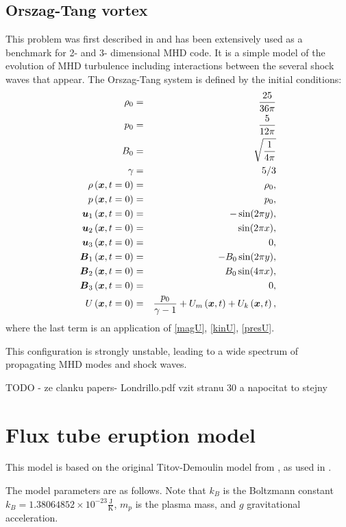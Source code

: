 \subsection{Orszag-Tang vortex}
This problem was first described in \cite{vortex} and has been extensively used as a benchmark for 2- and 3- dimensional MHD code. It is a simple model of the evolution of MHD turbulence including interactions between the several shock waves that appear. The Orszag-Tang system is defined by the initial conditions:
\begin{eqnarray}
\rho_0 & = & \frac{25}{36 \pi}\\ \nonumber
p_0 & = & \frac{5}{12 \pi}\\  \nonumber
B_0 & = & \sqrt{\frac{1}{4 \pi}}\\ \nonumber
\gamma & = & 5 / 3\\ \nonumber
\rho\left(\mbox{\boldmath $x$}, t = 0\right) & = & \rho_0,\\ \nonumber
p\left(\mbox{\boldmath $x$}, t = 0\right) & = & p_0,\\ \nonumber
\mbox{\boldmath $u$}_1\left(\mbox{\boldmath $x$}, t = 0\right) & = & -\sin(2 \pi y),\\ \nonumber
\mbox{\boldmath $u$}_2\left(\mbox{\boldmath $x$}, t = 0\right) & = & \sin(2 \pi x),\\ \nonumber
\mbox{\boldmath $u$}_3\left(\mbox{\boldmath $x$}, t = 0\right) & = & 0,\\ \nonumber
\mbox{\boldmath $B$}_1\left(\mbox{\boldmath $x$}, t = 0\right) & = & -B_0 \sin(2 \pi y),\\ \nonumber
\mbox{\boldmath $B$}_2\left(\mbox{\boldmath $x$}, t = 0\right) & = & B_0 \sin(4 \pi x),\\ \nonumber
\mbox{\boldmath $B$}_3\left(\mbox{\boldmath $x$}, t = 0\right) & = & 0,\\ \nonumber
U\left(\mbox{\boldmath $x$}, t = 0\right) & = & \frac{p_0}{\gamma - 1} + U_m\left(\mbox{\boldmath $x$}, t\right) + U_k\left(\mbox{\boldmath $x$}, t\right),
\end{eqnarray}
where the last term is an application of \ref{magU}, \ref{kinU}, \ref{presU}.

This configuration is strongly unstable, leading to a wide spectrum of propagating MHD modes and shock waves.

TODO - ze clanku papers- Londrillo.pdf vzit stranu 30 a napocitat to stejny

\section{Flux tube eruption model}
This model is based on the original Titov-Demoulin model from \cite{td}, as used in \cite{miraClanek}.

The model parameters are as follows. Note that $k_B$ is the Boltzmann constant $k_B = 1.38064852 \times 10^{-23} \frac{\mathrm{J}}{\mathrm{K}}$, $m_p$ is the plasma mass, and $g$ gravitational acceleration.

